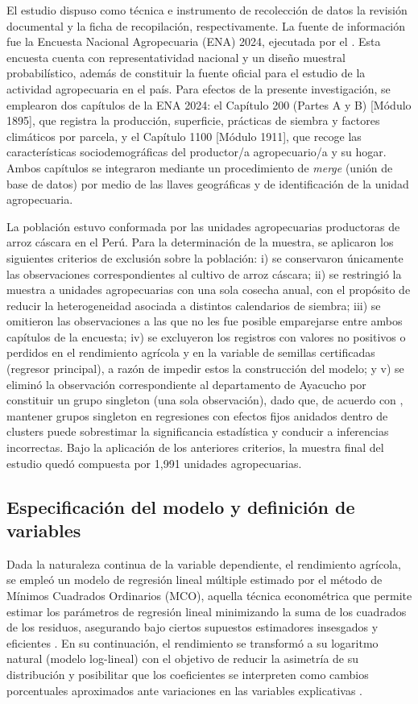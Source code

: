 \documentclass[11pt,a4paper,twocolumn]{article}
\begin{document}
El estudio dispuso como técnica e instrumento de recolección de datos la revisión documental y la ficha de recopilación, respectivamente. La fuente de información fue la Encuesta Nacional Agropecuaria (ENA) 2024, ejecutada por el \citet{inei}. Esta encuesta cuenta con representatividad nacional y un diseño muestral probabilístico, además de constituir la fuente oficial para el estudio de la actividad agropecuaria en el país. Para efectos de la presente investigación, se emplearon dos capítulos de la ENA 2024: el Capítulo 200 (Partes A y B) [Módulo 1895], que registra la producción, superficie, prácticas de siembra y factores climáticos por parcela, y el Capítulo 1100 [Módulo 1911], que recoge las características sociodemográficas del productor/a agropecuario/a y su hogar. Ambos capítulos se integraron mediante un procedimiento de \textit{merge} (unión de base de datos) por medio de las llaves geográficas y de identificación de la unidad agropecuaria.

La población estuvo conformada por las unidades agropecuarias productoras de arroz cáscara en el Perú. Para la determinación de la muestra, se aplicaron los siguientes criterios de exclusión sobre la población: i) se conservaron únicamente las observaciones correspondientes al cultivo de arroz cáscara; ii) se restringió la muestra a unidades agropecuarias con una sola cosecha anual, con el propósito de reducir la heterogeneidad asociada a distintos calendarios de siembra; iii) se omitieron las observaciones a las que no les fue posible emparejarse entre ambos capítulos de la encuesta; iv) se excluyeron los registros con valores no positivos o perdidos en el rendimiento agrícola y en la variable de semillas certificadas (regresor principal), a razón de impedir estos la construcción del modelo; y v) se eliminó la observación correspondiente al departamento de Ayacucho por constituir un grupo singleton (una sola observación), dado que, de acuerdo con \citet{correia2015}, mantener grupos singleton en regresiones con efectos fijos anidados dentro de clusters puede sobrestimar la significancia estadística y conducir a inferencias incorrectas. Bajo la aplicación de los anteriores criterios, la muestra final del estudio quedó compuesta por 1,991 unidades agropecuarias.

\subsection{Especificación del modelo y definición de variables}
Dada la naturaleza continua de la variable dependiente, el rendimiento agrícola, se empleó un modelo de regresión lineal múltiple estimado por el método de Mínimos Cuadrados Ordinarios (MCO), aquella técnica econométrica que permite estimar los parámetros de regresión lineal minimizando la suma de los cuadrados de los residuos, asegurando bajo ciertos supuestos estimadores insesgados y eficientes \citep{wooldridge}. En su continuación, el rendimiento se transformó a su logaritmo natural (modelo log-lineal) con el objetivo de reducir la asimetría de su distribución y posibilitar que los coeficientes se interpreten como cambios porcentuales aproximados ante variaciones en las variables explicativas \citep{lozares1998}.
\end{document}
